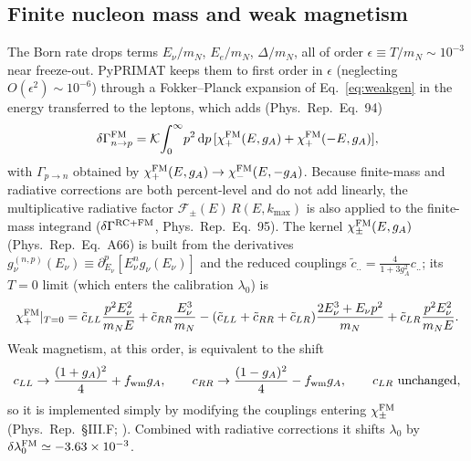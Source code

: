 \documentclass[11pt,a4paper]{article}
\newcommand{\dd}{\mathrm{d}}
\newcommand{\PR}{Phys.\ Rep.}
\newcommand{\Gap}{\Delta}
\newcommand{\Kw}{\mathcal{K}}
\newcommand{\cLL}{c_{LL}}
\newcommand{\cRR}{c_{RR}}
\newcommand{\cLR}{c_{LR}}
\begin{document}
\subsection*{Finite nucleon mass and weak magnetism}
The Born rate drops terms $E_\nu/m_N$, $E_e/m_N$, $\Gap/m_N$, all of order
$\epsilon\equiv T/m_N\sim10^{-3}$ near freeze-out. PyPRIMAT keeps them to first
order in $\epsilon$ (neglecting $O(\epsilon^2)\sim10^{-6}$) through a
Fokker--Planck expansion of Eq.~\eqref{eq:weakgen} in the energy transferred to
the leptons, which adds (\PR\ Eq.~94)
\begin{equation}
  \delta\Gamma^{\rm FM}_{n\to p}
   = \Kw\!\int_0^\infty\! p^2\,\dd p\,
     [\chi^{\rm FM}_+(E,g_A)+\chi^{\rm FM}_+(-E,g_A)],
\end{equation}
with $\Gamma_{p\to n}$ obtained by $\chi^{\rm FM}_+(E,g_A)\to\chi^{\rm
FM}_-(E,-g_A)$. Because finite-mass and radiative corrections are both
percent-level and do not add linearly, the multiplicative radiative factor
$\mathcal F_\pm(E)\,R(E,k_{\max})$ is also applied to the finite-mass integrand
($\delta\Gamma^{\rm RC+FM}$, \PR\ Eq.~95). The kernel $\chi^{\rm FM}_\pm(E,g_A)$
(\PR\ Eq.~A66) is built from the derivatives
$g^{(n,p)}_\nu(E_\nu)\equiv\partial_{E_\nu}^p[E_\nu^n g_\nu(E_\nu)]$ and the
reduced couplings $\tilde c_{..}=\tfrac{4}{1+3g_A^2}c_{..}$; its $T=0$ limit
(which enters the calibration $\lambda_0$) is
\begin{equation}
  \chi^{\rm FM}_+|_{T=0} = \tilde\cLL\frac{p^2E_\nu^2}{m_NE}
    + \tilde\cRR\frac{E_\nu^3}{m_N}
    - (\tilde\cLL+\tilde\cRR+\tilde\cLR)\frac{2E_\nu^3+E_\nu p^2}{m_N}
    + \tilde\cLR\frac{p^2E_\nu^2}{m_NE}.
\end{equation}
Weak magnetism, at this order, is equivalent to the shift
\begin{equation}
  \cLL\to\frac{(1+g_A)^2}{4}+f_{\rm wm}g_A, \qquad
  \cRR\to\frac{(1-g_A)^2}{4}-f_{\rm wm}g_A, \qquad
  \cLR \text{ unchanged},
\end{equation}
so it is implemented simply by modifying the couplings entering
$\chi^{\rm FM}_\pm$ (\PR\ \S III.F; \cite{Seckel1993}). Combined with radiative
corrections it shifts $\lambda_0$ by $\delta\lambda_0^{\rm FM}\simeq-3.63\times
10^{-3}$.
\end{document}
